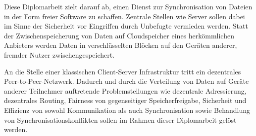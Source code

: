Diese Diplomarbeit zielt darauf ab, einen Dienst zur Synchronisation von Dateien in der Form freier Software zu schaffen.
Zentrale Stellen wie Server sollen dabei im Sinne der Sicherheit vor Eingriffen durch Unbefugte vermieden werden.
Statt der Zwischenspeicherung von Daten auf Cloudspeicher eines herkömmlichen Anbieters werden Daten in verschlüsselten Blöcken auf den Geräten anderer, fremder Nutzer zwischengespeichert.

An die Stelle einer klassischen Client-Server Infrastruktur tritt ein dezentrales Peer-to-Peer-Netzwerk. %
Dadurch und durch die Verteilung von Daten auf Geräte anderer Teilnehmer auftretende Problemstellungen wie dezentrale Adressierung, dezentrales Routing, Fairness von gegenseitiger Speicherfreigabe, Sicherheit und Effizienz von sowohl Kommunikation als auch Synchronisation sowie Behandlung von Synchronisationskonflikten sollen im Rahmen dieser Diplomarbeit gelöst werden.

